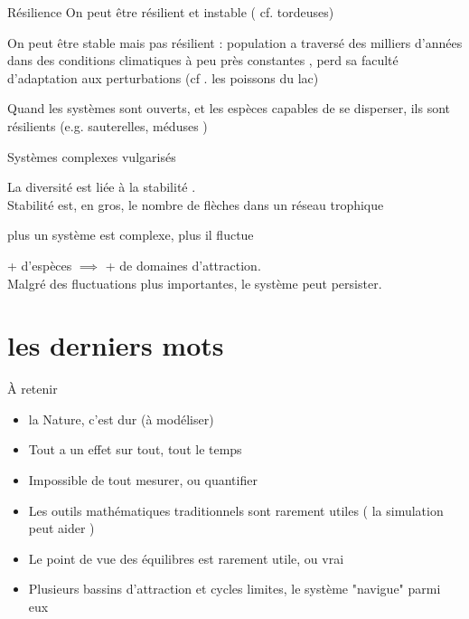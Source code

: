\documentclass[11,aspectratio=1610]{beamer}
\begin{document}
\begin{frame}{Résilience}
\vfill
On peut être résilient \alert{et} instable ( cf. tordeuses)
\vfill

On peut être stable mais pas résilient :  population a traversé des milliers d'années dans des conditions climatiques à peu près constantes , perd sa faculté d'adaptation aux perturbations (cf . les poissons du lac) 

\vfill
Quand les systèmes sont \alert{ouverts}, et les espèces capables de \alert{se disperser}, ils sont résilients (e.g. sauterelles, méduses )

\vfill

\end{frame}
\begin{frame}{Systèmes complexes vulgarisés}


 La diversité est liée à la stabilité . \\

 Stabilité est, en gros, le nombre de flèches dans un réseau trophique  

\vfill

 
 plus un système est complexe, plus il fluctue

\vfill

 + d'espèces $\implies$ + de  domaines d'attraction. \\

 Malgré des fluctuations plus importantes, le système peut persister. 
 



\end{frame}


\section{les derniers mots}

\begin{frame}{À retenir}

\begin{itemize}
 \item la Nature, c'est dur (à modéliser)
 \item Tout a un effet sur tout, tout le temps 
 \item Impossible de tout mesurer, ou quantifier 
 \item Les outils mathématiques traditionnels sont rarement utiles ( la simulation peut aider )
 \item Le point de vue des équilibres est rarement utile, ou vrai  
 \item Plusieurs bassins d'attraction et cycles limites, le système "navigue" parmi eux 
\end{itemize}

\end{frame}
\end{document}
